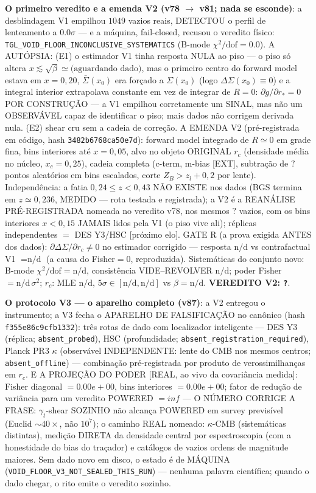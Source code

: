 \documentclass[11pt]{article}
\theoremstyle{definition}\newtheorem{deriv}{Derivação}
\begin{document}
\textbf{O primeiro veredito e a emenda V2 (v78 $\to$ v81; nada se esconde)}: a desblindagem V1 empilhou $1049$ vazios reais, DETECTOU o perfil de lenteamento a $0.0\sigma$ --- e a máquina, fail-closed, recusou o veredito físico: \texttt{TGL\_VOID\_FLOOR\_INCONCLUSIVE\_SYSTEMATICS} (B-mode $\chi^2/\mathrm{dof}=0.0$). A AUTÓPSIA: (E1) o estimador V1 tinha resposta NULA ao piso --- o piso só altera $x\lesssim\sqrt{\beta}\simeq \text{(aguardando dado)}$, mas o primeiro centro do forward model estava em $x=0{,}20$, $\bar\Sigma(x_0)$ era forçado a $\Sigma(x_0)$ (logo $\Delta\Sigma(x_0)\equiv0$) e a integral interior extrapolava constante em vez de integrar de $R=0$: $\partial g/\partial r_*=0$ POR CONSTRUÇÃO --- a V1 empilhou corretamente um SINAL, mas não um OBSERVÁVEL capaz de identificar o piso; mais dados não corrigem derivada nula. (E2) shear cru sem a cadeia de correção. A EMENDA V2 (pré-registrada em código, hash \texttt{3482b6768ca50e7d}): forward model integrado de $R\simeq0$ em grade fina, bins interiores até $x=0{,}05$, alvo no objeto ORIGINAL $r_c$ (densidade média no núcleo, $x_c=0{,}25$), cadeia completa (c-term, m-bias [EXT], subtração de $?$ pontos aleatórios em bins escalados, corte $Z_B>z_l+0{,}2$ por lente). Independência: a fatia $0{,}24\le z<0{,}43$ NÃO EXISTE nos dados (BGS termina em $z\simeq0{,}236$, MEDIDO --- rota testada e registrada); a V2 é a REANÁLISE PRÉ-REGISTRADA nomeada no veredito v78, nos mesmos $?$ vazios, com os bins interiores $x<0{,}15$ JAMAIS lidos pela V1 (o piso vive ali); réplicas independentes $=$ DES Y3/HSC [próximo elo]. GATE R (a prova exigida ANTES dos dados): $\partial\Delta\Sigma/\partial r_c\neq0$ no estimador corrigido --- resposta $\text{n/d}$ vs contrafactual V1 $= \text{n/d}$ (a causa do Fisher$=0$, reproduzida). Sistemáticas do conjunto novo: B-mode $\chi^2/\mathrm{dof}=\text{n/d}$, consistência VIDE--REVOLVER $\text{n/d}$; poder Fisher $=\text{n/d}\,\sigma^2$; $r_c$: MLE $\text{n/d}$, $5\sigma\in[\text{n/d},\text{n/d}]$ vs $\beta=\text{n/d}$. \textbf{VEREDITO V2: \texttt{?}}.

\textbf{O protocolo V3 --- o aparelho completo (v87)}: a V2 entregou o instrumento; a V3 fecha o APARELHO DE FALSIFICAÇÃO no canônico (hash \texttt{f355e86c9cfb1332}): três rotas de dado com localizador inteligente --- DES Y3 (réplica; \texttt{absent\_probed}), HSC (profundidade; \texttt{absent\_registration\_required}), Planck PR3 $\kappa$ (observável INDEPENDENTE: lente do CMB nos mesmos centros; \texttt{absent\_offline}) --- combinação pré-registrada por produto de verossimilhanças em $r_c$. E A PROJEÇÃO DO PODER [REAL, ao vivo da covariância medida]: Fisher diagonal $=0.00e+00$, bins interiores $=0.00e+00$; fator de redução de variância para um veredito POWERED $=inf$ --- O NÚMERO CORRIGE A FRASE: $\gamma_t$-shear SOZINHO não alcança POWERED em survey previsível (Euclid $\sim40\times$, não $10^7$); o caminho REAL nomeado: $\kappa$-CMB (sistemáticas distintas), medição DIRETA da densidade central por espectroscopia (com a honestidade do bias do traçador) e catálogos de vazios ordens de magnitude maiores. Sem dado novo em disco, o estado é de MÁQUINA (\texttt{VOID\_FLOOR\_V3\_NOT\_SEALED\_THIS\_RUN}) --- nenhuma palavra científica; quando o dado chegar, o rito emite o veredito sozinho.
\end{document}
